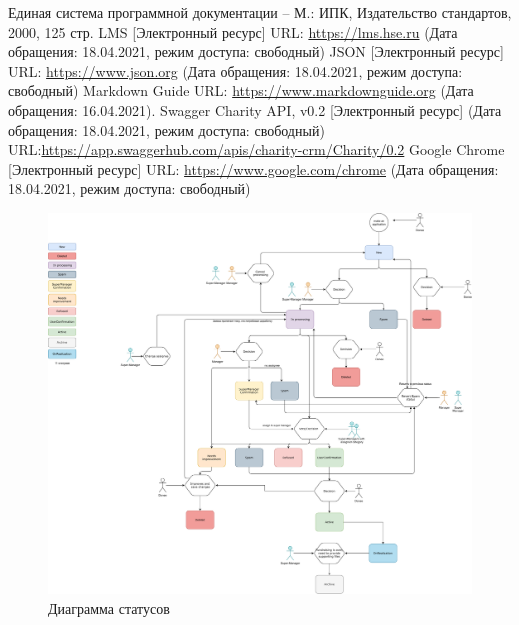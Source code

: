 \documentclass[a4paper,12pt,reqno]{article}
\begin{document}
	\newpage
	\begin{thebibliography}{3}
		Единая система программной документации – М.: ИПК, Издательство стандартов, 2000, 125 стр.
		LMS [Электронный ресурс] URL: 
		\url{https://lms.hse.ru} (Дата обращения: 18.04.2021, режим доступа: свободный)
		 JSON [Электронный ресурс] URL: \url{https://www.json.org} (Дата обращения: 18.04.2021, режим доступа: свободный)
		 Markdown Guide URL: \url{https://www.markdownguide.org} (Дата обращения: 16.04.2021).
		 Swagger Charity API, v0.2 [Электронный ресурс] (Дата обращения: 18.04.2021, режим доступа: свободный) URL:\url{https://app.swaggerhub.com/apis/charity-crm/Charity/0.2}
		Google Chrome [Электронный ресурс] URL: 
		\url{https://www.google.com/chrome} (Дата обращения: 18.04.2021, режим доступа: свободный)
	\end{thebibliography}
	
	\newpage
	
	
	\newpage
	
	
	
	\newpage
	

	
	\newpage
	
	\begin{figure}[H]
		\centering
		\includegraphics[width = 0.9\linewidth]{img/statusflow.pdf}
		\caption{Диаграмма статусов}
		\label{pic: status}
	\end{figure}
	
	                    \newpage
	
	
	\newpage
	\listRegistration
						
\end{document}
